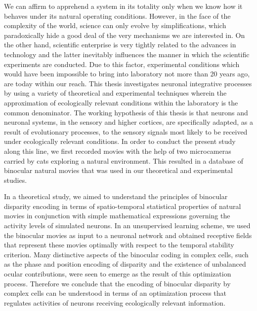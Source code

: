 We can affirm to apprehend a system in its totality only when we know how
it behaves under its natural operating conditions. However, in the face of
the complexity of the world, science can only evolve by simplifications,
which paradoxically hide a good deal of the very mechanisms we are
interested in. On the other hand, scientific enterprise is very tightly
related to the advances in technology and the latter inevitably influences
the manner in which the scientific experiments are conducted. Due to this
factor, experimental conditions which would have been impossible to bring
into laboratory not more than 20 years ago, are today within our reach.
This thesis investigates neuronal integrative processes by using a variety
of theoretical and experimental techniques wherein the approximation of
ecologically relevant conditions within the laboratory is the common
denominator. The working hypothesis of this thesis is that neurons and
neuronal systems, in the sensory and higher cortices, are specifically
adapted, as a result of evolutionary processes, to the sensory signals most
likely to be received under ecologically relevant conditions. In order to
conduct the present study along this line, we first recorded movies with
the help of two microcameras carried by cats exploring a natural
environment. This resulted in a database of binocular natural movies that
was used in our theoretical and experimental studies. 

In a theoretical study, we aimed to understand the principles of binocular
disparity encoding in terms of spatio-temporal statistical properties of
natural movies in conjunction with simple mathematical expressions
governing the activity levels of simulated neurons. In an unsupervised
learning scheme, we used the binocular movies as input to a neuronal
network and obtained receptive fields that represent these movies optimally
with respect to the temporal stability criterion. Many distinctive aspects
of the binocular coding in complex cells, such as the phase and position
encoding of disparity and the existence of unbalanced ocular contributions,
were seen to emerge as the result of this optimization process. Therefore
we conclude that the encoding of binocular disparity by complex cells can
be understood in terms of an optimization process that regulates activities
of neurons receiving ecologically relevant information. 

